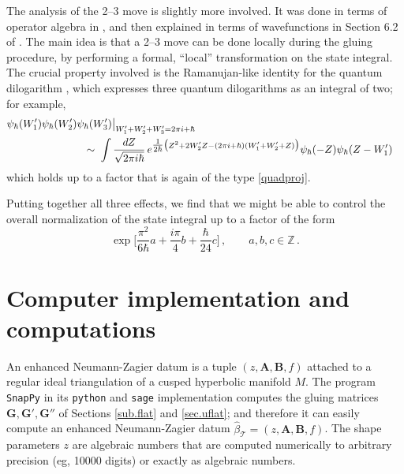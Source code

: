 \documentclass[12pt]{amsart}
\newcommand{\lbl}{\label}
\theoremstyle{definition}
\def\be{  \begin{equation} }
\def\ee{  \end{equation} }
\newcommand{\CT}{\mathcal{T}}
\newcommand{\Z}{\mathbb{Z}}
\newcommand{\mb}{\mathbf}
\numberwithin{equation}{section}
\begin{document}
The analysis of the 2--3 move is slightly more involved. It was done in terms of operator algebra in \cite{D1}, and then explained in terms of wavefunctions in Section 6.2 of \cite{DGG1}. The main idea is that a 2--3 move can be done locally during the gluing procedure, by performing a formal, ``local'' transformation on the state integral. The crucial property involved is the Ramanujan-like identity for the quantum dilogarithm \cite{FKVolkov, PT}, which expresses three quantum dilogarithms as an integral of two; for example,
%
\begin{align} \notag \psi_\hbar(W_1')\psi_\hbar(W_2')\psi_\hbar(W_3')\big|_{W_1'+W_2'+W_3'=2\pi i+\hbar} \\ &\hspace{-1.5in} \;\sim\; \int \frac{dZ}{\sqrt{2\pi i\hbar}}\, e^{\tfrac{1}{2\hbar}\big(Z^2 +2 W_2'Z-(2\pi i+\hbar)(W_1'+W_2'+Z)\big)} \psi_\hbar(-Z)\psi_\hbar(Z-W_1')
\end{align}
%
which holds up to a factor that is again of the type \eqref{quadproj}. 

Putting together all three effects, we find that we might be able to control the overall normalization of the state integral up to a factor of the form
%
\be \label{SIMfactor}
\exp\Big[\frac{\pi^2}{6\hbar}a+\frac{i\pi}{4}b+\frac{\hbar}{24}c\Big]\,,\qquad a,b,c\in \Z\,.
\ee







\section{Computer implementation and computations}
\lbl{app.compute}

An enhanced Neumann-Zagier datum is a tuple $(z,\mb A,\mb B,f)$ attached
to a regular ideal triangulation of a cusped hyperbolic manifold $M$.
The program \texttt{SnapPy} \cite{SnapPy} in its {\tt python} and 
{\tt sage} implementation computes the gluing matrices 
$\mb G,\mb G',\mb G''$ of Sections \ref{sub.flat} and \ref{sec.uflat}; 
and therefore it can easily compute an enhanced Neumann-Zagier datum 
$\widehat\beta_\CT=(z,\mb A,\mb B,f)$. The shape parameters $z$
are algebraic numbers that are computed numerically to arbitrary precision
(eg, 10000 digits) or exactly as algebraic numbers.
\end{document}
